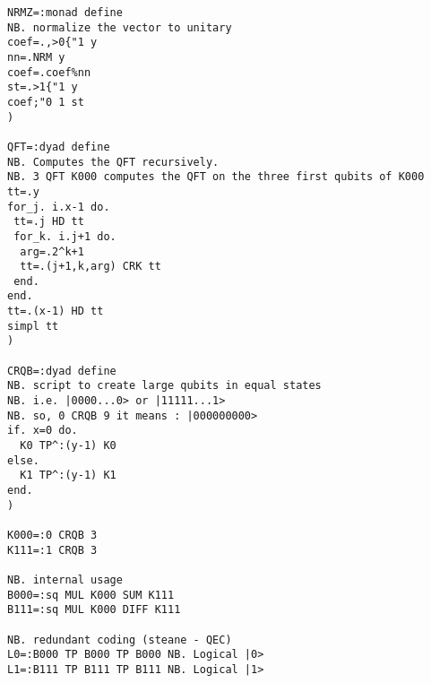 \documentclass[a4paper,11pt]{amsbook}
\begin{document}
\begin{verbatim}
NRMZ=:monad define
NB. normalize the vector to unitary
coef=.,>0{"1 y
nn=.NRM y
coef=.coef%nn
st=.>1{"1 y
coef;"0 1 st
)

QFT=:dyad define
NB. Computes the QFT recursively.
NB. 3 QFT K000 computes the QFT on the three first qubits of K000
tt=.y
for_j. i.x-1 do.
 tt=.j HD tt
 for_k. i.j+1 do.
  arg=.2^k+1
  tt=.(j+1,k,arg) CRK tt
 end.
end.
tt=.(x-1) HD tt
simpl tt
)

CRQB=:dyad define
NB. script to create large qubits in equal states
NB. i.e. |0000...0> or |11111...1> 
NB. so, 0 CRQB 9 it means : |000000000>
if. x=0 do.
  K0 TP^:(y-1) K0
else.
  K1 TP^:(y-1) K1
end.
)

K000=:0 CRQB 3
K111=:1 CRQB 3

NB. internal usage 
B000=:sq MUL K000 SUM K111
B111=:sq MUL K000 DIFF K111

NB. redundant coding (steane - QEC)
L0=:B000 TP B000 TP B000 NB. Logical |0>
L1=:B111 TP B111 TP B111 NB. Logical |1>
\end{verbatim}
\end{document}
